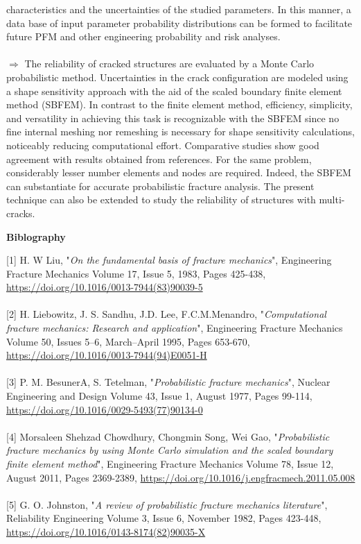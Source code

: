 \documentclass[12pt]{article}
\begin{document}
characteristics and the uncertainties of the studied
parameters. In this manner, a data base of input parameter probability distributions can be formed to
facilitate future PFM and other engineering probability and risk analyses.
\\\\$\Rightarrow$ The reliability of cracked structures are evaluated by a Monte Carlo probabilistic method. Uncertainties in the crack configuration are modeled using a shape sensitivity approach with the aid of the scaled boundary finite element method
(SBFEM). In contrast to the finite element method, efficiency, simplicity, and versatility in achieving this task is recognizable
with the SBFEM since no fine internal meshing nor remeshing is necessary for shape sensitivity calculations, noticeably
reducing computational effort. Comparative studies show good agreement with results obtained from references. For the
same problem, considerably lesser number elements and nodes are required. Indeed, the SBFEM can substantiate for accurate probabilistic fracture analysis. The present technique can also be extended to study the reliability of structures with
multi-cracks.



\pagebreak
\textbf{\Huge Biblography}\\

\begin{flushleft}
    

[1] H. W Liu, "{\it On the fundamental basis of fracture mechanics}", Engineering Fracture Mechanics Volume 17, Issue 5, 1983, Pages 425-438, \url{https://doi.org/10.1016/0013-7944(83)90039-5}\\~\\

[2] H. Liebowitz, J. S. Sandhu, J.D. Lee, F.C.M.Menandro, "{\it Computational fracture mechanics: Research and application}", Engineering Fracture Mechanics Volume 50, Issues 5–6, March–April 1995, Pages 653-670, \url{https://doi.org/10.1016/0013-7944(94)E0051-H}\\~\\

[3] P. M. BesunerA, S. Tetelman, "{\it Probabilistic fracture mechanics}", Nuclear Engineering and Design Volume 43, Issue 1, August 1977, Pages 99-114, \url{https://doi.org/10.1016/0029-5493(77)90134-0}\\~\\

[4] Morsaleen Shehzad Chowdhury, Chongmin Song, Wei Gao, "{\it Probabilistic fracture mechanics by using Monte Carlo simulation and the scaled boundary finite element method}", Engineering Fracture Mechanics Volume 78, Issue 12, August 2011, Pages 2369-2389, \url{https://doi.org/10.1016/j.engfracmech.2011.05.008}\\~\\

[5] G. O. Johnston, "{\it A review of probabilistic fracture mechanics literature}", Reliability Engineering Volume 3, Issue 6, November 1982, Pages 423-448, \url{https://doi.org/10.1016/0143-8174(82)90035-X}\\

\end{flushleft}
\end{document}
